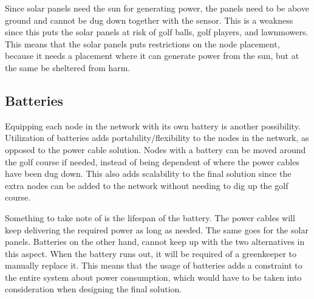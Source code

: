 Since solar panels need the sun for generating power, the panels need to be above ground and cannot be dug down together with the sensor. This is a weakness since this puts the solar panels at risk of golf balls, golf players, and lawnmowers. This means that the solar panels puts restrictions on the node placement, because it needs a placement where it can generate power from the sun, but at the same be sheltered from harm.

\subsection*{Batteries}
Equipping each node in the network with its own battery is another possibility. Utilization of batteries adds portability/flexibility to the nodes in the network, as opposed to the power cable solution. Nodes with a battery can be moved around the golf course if needed, instead of being dependent of where the power cables have been dug down. This also adds scalability to the final solution since the extra nodes can be added to the network without needing to dig up the golf course.

Something to take note of is the lifespan of the battery. The power cables will keep delivering the required power as long as needed. The same goes for the solar panels. Batteries on the other hand, cannot keep up with the two alternatives in this aspect. When the battery runs out, it will be required of a greenkeeper to manually replace it. This means that the usage of batteries adds a constraint to the entire system about power consumption, which would have to be taken into consideration when designing the final solution.
